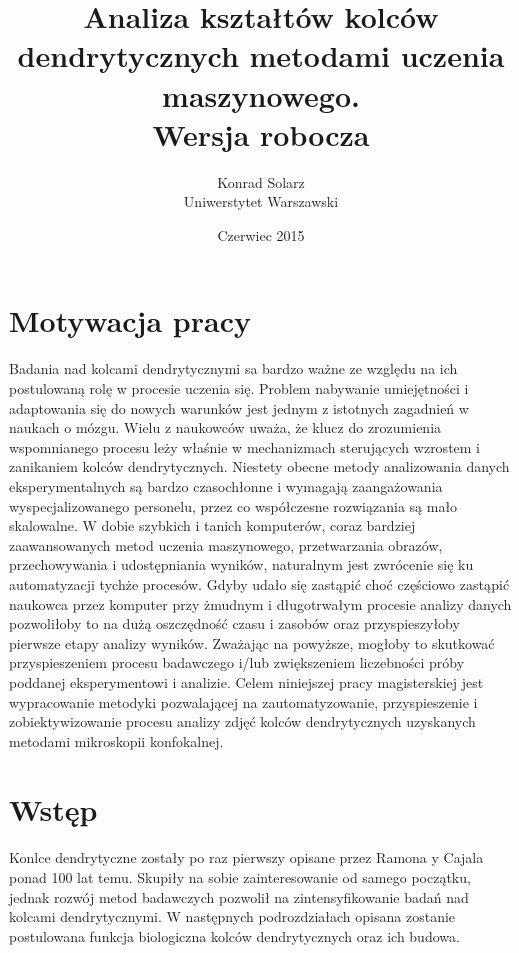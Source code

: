 \documentclass{article}
\begin{document}
\title{Analiza kształtów kolców dendrytycznych metodami uczenia maszynowego.\\Wersja robocza}
\author{Konrad Solarz\\Uniwerstytet Warszawski}
\date{Czerwiec 2015}
\maketitle
\clearpage
\begin{abstract}


\end{abstract}
\clearpage

\tableofcontents
\clearpage

\section{Motywacja pracy}
Badania nad kolcami dendrytycznymi sa bardzo ważne ze względu na ich postulowaną rolę w procesie uczenia się.
Problem nabywanie umiejętności i adaptowania się do nowych warunków jest jednym z istotnych zagadnień w naukach o mózgu.
Wielu z naukowców uważa, że klucz do zrozumienia wspomnianego procesu leży właśnie w mechanizmach sterujących wzrostem i zanikaniem kolców dendrytycznych.
Niestety obecne metody analizowania danych eksperymentalnych są bardzo czasochłonne i wymagają zaangażowania wyspecjalizowanego personelu, przez co współczesne rozwiązania są mało skalowalne.
W dobie szybkich i tanich komputerów, coraz bardziej zaawansowanych metod uczenia maszynowego, przetwarzania obrazów, przechowywania i udostępniania wyników, naturalnym jest zwrócenie się ku automatyzacji tychże procesów.
Gdyby udało się zastąpić choć częściowo zastąpić naukowca przez komputer przy żmudnym i długotrwałym procesie analizy danych pozwoliłoby to na dużą oszczędność czasu i zasobów oraz przyspieszyłoby pierwsze etapy analizy wyników.
Zważając na powyższe, mogłoby to skutkować przyspieszeniem procesu badawczego i/lub zwiększeniem liczebności próby poddanej eksperymentowi i analizie.
Celem niniejszej pracy magisterskiej jest wypracowanie metodyki pozwalającej na zautomatyzowanie, przyspieszenie i zobiektywizowanie procesu analizy zdjęć kolców dendrytycznych uzyskanych metodami mikroskopii konfokalnej.



\section{Wstęp}
Konlce dendrytyczne zostały po raz pierwszy opisane przez Ramona y Cajala ponad 100 lat temu. %
Skupiły na sobie zainteresowanie od samego początku, jednak rozwój metod badawczych 
pozwolił na zintensyfikowanie badań nad kolcami dendrytycznymi. W następnych podrozdziałach opisana zostanie postulowana funkcja biologiczna kolców dendrytycznych oraz ich budowa.
\end{document}
